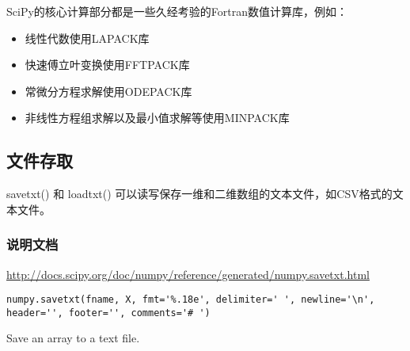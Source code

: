 SciPy的核心计算部分都是一些久经考验的Fortran数值计算库，例如：

\begin{itemize}
\item
线性代数使用LAPACK库
\item
快速傅立叶变换使用FFTPACK库
\item
常微分方程求解使用ODEPACK库
\item
非线性方程组求解以及最小值求解等使用MINPACK库
\end{itemize}



\subsection{文件存取}
savetxt() 和 loadtxt() 可以读写保存一维和二维数组的文本文件，如CSV格式的文本文件。

\subsubsection{说明文档}
\url{http://docs.scipy.org/doc/numpy/reference/generated/numpy.savetxt.html}

\verb|numpy.savetxt(fname, X, fmt='%.18e', delimiter=' ', newline='\n', header='', footer='', comments='# ')|

Save an array to a text file.

